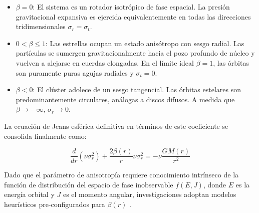                 \begin{itemize}
                    \item $\beta = 0$: El sistema es un rotador isotrópico de 
                    fase espacial. La presión gravitacional expansiva es 
                    ejercida equivalentemente en todas las direcciones 
                    tridimensionales $\sigma_r = \sigma_t$.

                    \item $0 < \beta \leq 1$: Las estrellas ocupan un estado 
                    anisótropo con sesgo radial. Las partículas se sumergen 
                    gravitacionalmente hacia el pozo profundo de núcleo y 
                    vuelven a alejarse en cuerdas elongadas. En el límite ideal 
                    $\beta = 1$, las órbitas son puramente puras agujas radiales 
                    y $\sigma_t = 0$.

                    \item $\beta < 0$: El clúster adolece de un sesgo 
                    tangencial. Las órbitas estelares son predominantemente 
                    circulares, análogas a discos difusos. A medida que $\beta 
                    \to -\infty$, $\sigma_r \to 0$.
                \end{itemize}

                La ecuación de Jeans esférica definitiva en términos de este 
                coeficiente se consolida finalmente como:

                \begin{equation}
                    \frac{d}{dr}(\nu \sigma_r^2) + \frac{2\beta(r)}{r} \nu 
                    \sigma_r^2 = - \nu \frac{GM(r)}{r^2}
                    \label{eq:jeans_esferica}
                \end{equation}

                Dado que el parámetro de anisotropía requiere conocimiento 
                intrínseco de la función de distribución del espacio de fase 
                inobservable $f(E, J)$, donde $E$ es la energía orbital y $J$ es 
                el momento angular, investigaciones adoptan modelos heurísticos 
                pre-configurados para $\beta(r)$ \cite{mamon2010kinematic}.
